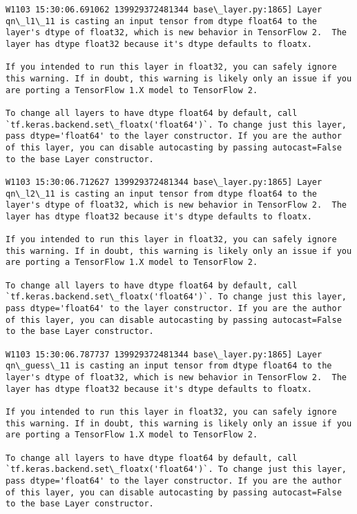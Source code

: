 \documentclass[11pt]{article}
\begin{document}
\begin{Verbatim}[commandchars=\\\{\}]
W1103 15:30:06.691062 139929372481344 base\_layer.py:1865] Layer qn\_l1\_11 is casting an input tensor from dtype float64 to the layer's dtype of float32, which is new behavior in TensorFlow 2.  The layer has dtype float32 because it's dtype defaults to floatx.

If you intended to run this layer in float32, you can safely ignore this warning. If in doubt, this warning is likely only an issue if you are porting a TensorFlow 1.X model to TensorFlow 2.

To change all layers to have dtype float64 by default, call `tf.keras.backend.set\_floatx('float64')`. To change just this layer, pass dtype='float64' to the layer constructor. If you are the author of this layer, you can disable autocasting by passing autocast=False to the base Layer constructor.

W1103 15:30:06.712627 139929372481344 base\_layer.py:1865] Layer qn\_l2\_11 is casting an input tensor from dtype float64 to the layer's dtype of float32, which is new behavior in TensorFlow 2.  The layer has dtype float32 because it's dtype defaults to floatx.

If you intended to run this layer in float32, you can safely ignore this warning. If in doubt, this warning is likely only an issue if you are porting a TensorFlow 1.X model to TensorFlow 2.

To change all layers to have dtype float64 by default, call `tf.keras.backend.set\_floatx('float64')`. To change just this layer, pass dtype='float64' to the layer constructor. If you are the author of this layer, you can disable autocasting by passing autocast=False to the base Layer constructor.

W1103 15:30:06.787737 139929372481344 base\_layer.py:1865] Layer qn\_guess\_11 is casting an input tensor from dtype float64 to the layer's dtype of float32, which is new behavior in TensorFlow 2.  The layer has dtype float32 because it's dtype defaults to floatx.

If you intended to run this layer in float32, you can safely ignore this warning. If in doubt, this warning is likely only an issue if you are porting a TensorFlow 1.X model to TensorFlow 2.

To change all layers to have dtype float64 by default, call `tf.keras.backend.set\_floatx('float64')`. To change just this layer, pass dtype='float64' to the layer constructor. If you are the author of this layer, you can disable autocasting by passing autocast=False to the base Layer constructor.


    \end{Verbatim}
\end{document}
